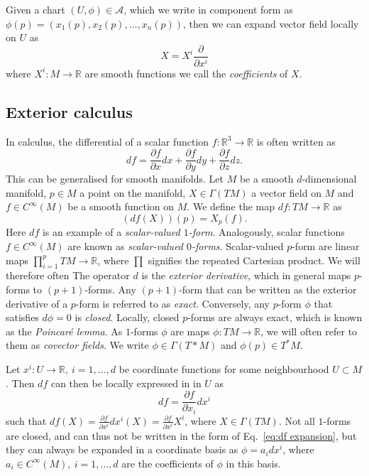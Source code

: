 Given a chart $(U, \phi) \in \mathcal{A}$, which we write in component form as $\phi(p) = (x_1(p), x_2(p), \dots, x_n(p))$, then we can expand vector field locally on $U$ as \citep{misnerGravitation2017}
\begin{equation}
	X = X^i \frac{\partial}{\partial x^i}
\end{equation}
where $X^i : M \to \mathbb{R}$ are smooth functions we call the \textit{coefficients} of $X$.

\subsection{Exterior calculus} \label{sec:Exterior calculus}

In calculus, the differential of a scalar function $f : \mathbb{R}^3 \to \mathbb{R}$ is often written as
\begin{equation}
df = \frac{\partial f}{\partial x} d x + \frac{\partial f}{\partial y} d y + \frac{\partial f}{\partial z} d z.
\end{equation}
This can be generalised for smooth manifolds. Let $M$ be a smooth $d$-dimensional manifold, $p \in M$ a point on the manifold, $X \in \Gamma(TM)$ a vector field on $M$ and $f \in C^\infty(M)$ be a smooth function on $M$. We define the map $df : TM \to \mathbb{R}$ as
\begin{equation} \label{eq:df action}
(df(X))(p) = X_p(f).
\end{equation}
Here $df$ is an example of a \textit{scalar-valued $1$-form}. Analogously, scalar functions $f \in C^\infty(M)$ are known as \textit{scalar-valued $0$-forms}. Scalar-valued $p$-form are linear maps $\prod_{i=1}^p TM \to \mathbb{R}$, where $\prod$ signifies the repeated Cartesian product. We will therefore often The operator $d$ is the \textit{exterior derivative}, which in general maps $p$-forms to $(p+1)$-forms. Any $(p+1)$-form that can be written as the exterior derivative of a $p$-form is referred to as \textit{exact}. Conversely, any $p$-form $\phi$ that satisfies $d \phi = 0$ is \textit{closed}. Locally, closed $p$-forms are always exact, which is known as the \textit{Poincaré lemma}. As $1$-forms $\phi$ are maps $\phi : TM \to \mathbb{R}$, we will often refer to them as \textit{covector fields}. We write $\phi \in \Gamma(T*M)$ and $\phi(p) \in T^*M$.
 
Let $x^i : U \to \mathbb{R},\ i=1,\dots,d$ be coordinate functions for some neighbourhood $U \subset M$. Then $df$ can then be locally expressed in in $U$ as
\begin{equation} \label{eq:df expansion}
df = \frac{\partial f}{\partial x_i} d x^i
\end{equation}
such that $df(X) = \frac{\partial f}{\partial x^i} dx^i(X) = \frac{\partial f}{\partial x^i} X^i$, where $X \in \Gamma(TM)$. Not all $1$-forms are closed, and can thus not be written in the form of Eq.~\ref{eq:df expansion}, but they can always be expanded in a coordinate basis as $\phi = a_i dx^i$, where $a_i \in C^\infty(M),\ i=1,\dots,d$ are the coefficients of $\phi$ in this basis.


